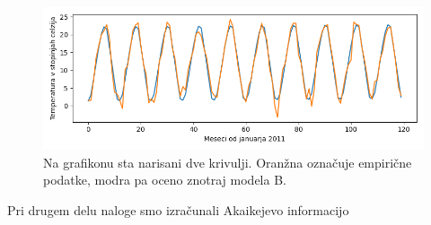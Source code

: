 \documentclass{article}
\begin{document}
\begin{figure}[H]
    \centering{}
    \includegraphics[scale=0.6]{3b.png}
    \caption{Na grafikonu sta narisani dve krivulji. Oranžna označuje empirične
    podatke, modra pa oceno znotraj modela B.}
    \label{slika 3b}
\end{figure}

Pri drugem delu naloge smo izračunali Akaikejevo informacijo 


% 
\end{document}
